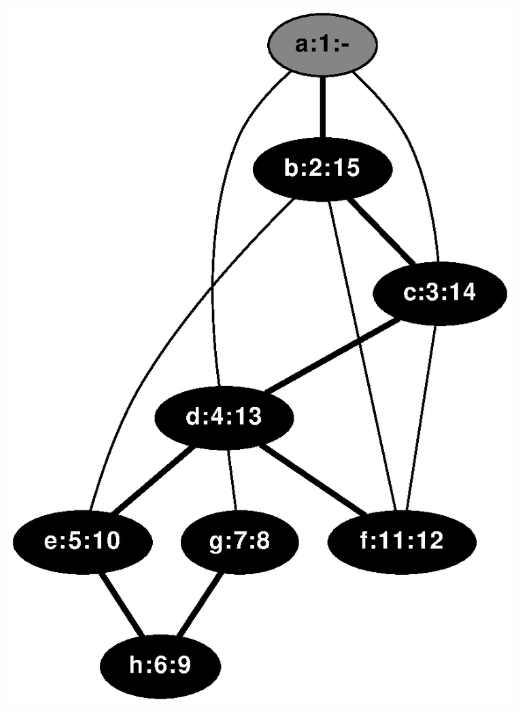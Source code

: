 \documentclass{article}
\begin{document}
\includegraphics[height=.3\textheight]{dfs_undirected_classroom_15.eps}
\vspace{1em}
\end{document}
